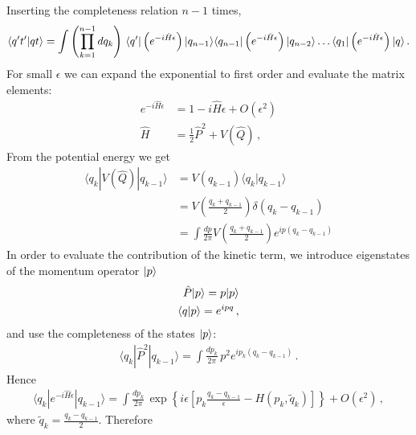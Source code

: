 Inserting the completeness relation $n-1$ times,
\begin{align}
  \label{eq:AmplitudeStepOne}
  \langle q't' | qt \rangle = \int \left(\prod_{k=1}^{n-1}dq_k\right)\,
  \langle q' | \left(e^{-i \hat{H} \epsilon}\right) |q_{n-1}\rangle
  \langle q_{n-1} | \left(e^{-i \hat{H} \epsilon}\right) |
  q_{n-2}\rangle \ldots \langle q_1 | \left(e^{-i \hat{H}
  \epsilon}\right) | q\rangle\, .
\end{align}
For small $\epsilon$ we can expand the exponential to first order and
evaluate the matrix elements:
\begin{align}
  e^{-i \hat{H} \epsilon} &= 1 - i \hat{H} \epsilon + O(\epsilon^2)\\
\hat{H} &= \frac12 \hat{P}^2 + V(\hat{Q})\, ,
\end{align}
From the potential energy we get
\begin{align}
  \langle q_k | V(\hat{Q}) | q_{k-1}\rangle &= V(q_{k-1}) \langle q_k
                                              | q_{k-1} \rangle \\
                                            &= V\left(\frac{q_k +
                                              q_{k-1}}{2}\right)
                                              \delta(q_k-q_{k-1}) \\
                                            & = \int \frac{dp}{2\pi} V\left(\frac{q_k +
                                              q_{k-1}}{2}\right) 
                                              e^{ip (q_k-q_{k-1})}
\end{align}
In order to evaluate the contribution of the kinetic term, we
introduce eigenstates of the momentum operator $| p \rangle$
\begin{align}
  \hat{P} | p \rangle = p | p \rangle \\
  \langle q | p \rangle = e^{ipq}\, ,
\end{align}
and use the completeness of the states $| p \rangle$:
\begin{align}
  \langle q_k | \hat{P}^2 | q_{k-1}\rangle = 
  \int \frac{dp_k}{2\pi}\, p^2 e^{ip_k(q_k-q_{k-1})}\, .
\end{align}
Hence
\begin{align}
  \label{eq:EpsStepBraKet}
  \langle q_k | e^{-i\hat{H}\epsilon} | q_{k-1}\rangle = 
  \int \frac{dp_k}{2\pi}\, \exp\left\{i\epsilon \left[
  p_k \frac{q_k-q_{k-1}}{\epsilon} - H\left(p_k,\tilde{q}_k\right)
  \right]
  \right\} + O(\epsilon^2)\, ,
\end{align}
where $\tilde{q}_k=\frac{q_k-q_{k-1}}{2}$. Therefore
